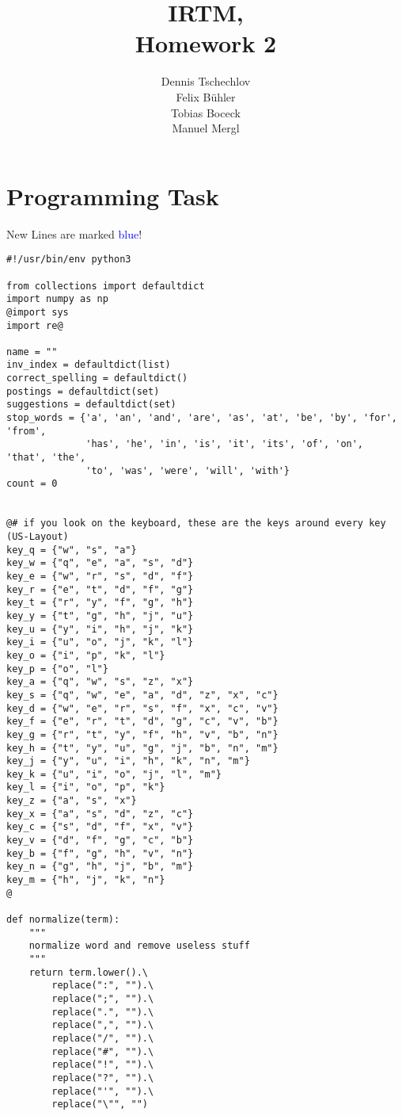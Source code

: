 \documentclass[12pt,pdftex,a4paper]{article}
\begin{document}
\title{ IRTM,\\ Homework 2}
\author{Dennis Tschechlov\\
		Felix Bühler\\
		Tobias Boceck\\
		Manuel Mergl}
\maketitle
\section*{Programming Task}


New Lines are marked \textcolor{blue}{blue}!

\begin{lstlisting}[style=base]
#!/usr/bin/env python3

from collections import defaultdict
import numpy as np
@import sys
import re@

name = ""
inv_index = defaultdict(list)
correct_spelling = defaultdict()
postings = defaultdict(set)
suggestions = defaultdict(set)
stop_words = {'a', 'an', 'and', 'are', 'as', 'at', 'be', 'by', 'for', 'from',
              'has', 'he', 'in', 'is', 'it', 'its', 'of', 'on', 'that', 'the',
              'to', 'was', 'were', 'will', 'with'}
count = 0


@# if you look on the keyboard, these are the keys around every key (US-Layout)
key_q = {"w", "s", "a"}
key_w = {"q", "e", "a", "s", "d"}
key_e = {"w", "r", "s", "d", "f"}
key_r = {"e", "t", "d", "f", "g"}
key_t = {"r", "y", "f", "g", "h"}
key_y = {"t", "g", "h", "j", "u"}
key_u = {"y", "i", "h", "j", "k"}
key_i = {"u", "o", "j", "k", "l"}
key_o = {"i", "p", "k", "l"}
key_p = {"o", "l"}
key_a = {"q", "w", "s", "z", "x"}
key_s = {"q", "w", "e", "a", "d", "z", "x", "c"}
key_d = {"w", "e", "r", "s", "f", "x", "c", "v"}
key_f = {"e", "r", "t", "d", "g", "c", "v", "b"}
key_g = {"r", "t", "y", "f", "h", "v", "b", "n"}
key_h = {"t", "y", "u", "g", "j", "b", "n", "m"}
key_j = {"y", "u", "i", "h", "k", "n", "m"}
key_k = {"u", "i", "o", "j", "l", "m"}
key_l = {"i", "o", "p", "k"}
key_z = {"a", "s", "x"}
key_x = {"a", "s", "d", "z", "c"}
key_c = {"s", "d", "f", "x", "v"}
key_v = {"d", "f", "g", "c", "b"}
key_b = {"f", "g", "h", "v", "n"}
key_n = {"g", "h", "j", "b", "m"}
key_m = {"h", "j", "k", "n"}
@

def normalize(term):
    """
    normalize word and remove useless stuff
    """
    return term.lower().\
        replace(":", "").\
        replace(";", "").\
        replace(".", "").\
        replace(",", "").\
        replace("/", "").\
        replace("#", "").\
        replace("!", "").\
        replace("?", "").\
        replace("'", "").\
        replace("\"", "")



\end{lstlisting}
\end{document}
